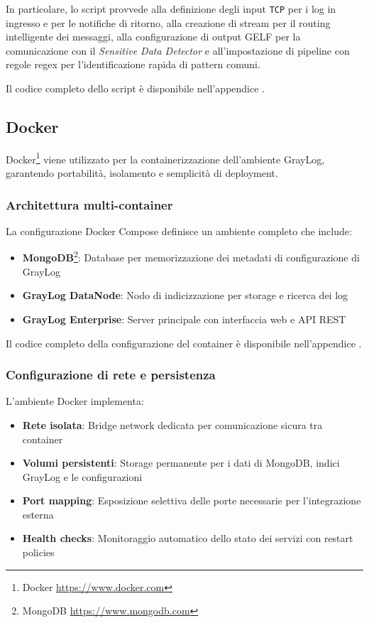 \documentclass[12pt]{report}
\begin{document}
In particolare, lo script provvede alla definizione degli input \texttt{TCP} per i log in ingresso e per le notifiche di ritorno, alla creazione di stream per il routing intelligente dei messaggi, alla configurazione di output GELF per la comunicazione con il \textit{Sensitive Data Detector} e all'impostazione di pipeline con regole regex per l'identificazione rapida di pattern comuni.

Il codice completo dello script è disponibile nell'appendice .

\subsection{Docker}
\label{subsec:docker}

Docker\footnote{Docker \url{https://www.docker.com}} viene utilizzato per la containerizzazione dell'ambiente GrayLog, garantendo portabilità, isolamento e semplicità di deployment.

\subsubsection{Architettura multi-container}
La configurazione Docker Compose definisce un ambiente completo che include:

\begin{itemize}
    \item \textbf{MongoDB}\footnote{MongoDB \url{https://www.mongodb.com}}: Database per memorizzazione dei metadati di configurazione di GrayLog
    \item \textbf{GrayLog DataNode}: Nodo di indicizzazione per storage e ricerca dei log
    \item \textbf{GrayLog Enterprise}: Server principale con interfaccia web e API REST
\end{itemize}

Il codice completo della configurazione del container è disponibile nell'appendice .

\subsubsection{Configurazione di rete e persistenza}
L'ambiente Docker implementa:

\begin{itemize}
    \item \textbf{Rete isolata}: Bridge network dedicata per comunicazione sicura tra container
    \item \textbf{Volumi persistenti}: Storage permanente per i dati di MongoDB, indici GrayLog e le configurazioni
    \item \textbf{Port mapping}: Esposizione selettiva delle porte necessarie per l'integrazione esterna
    \item \textbf{Health checks}: Monitoraggio automatico dello stato dei servizi con restart policies
\end{itemize}
\end{document}
